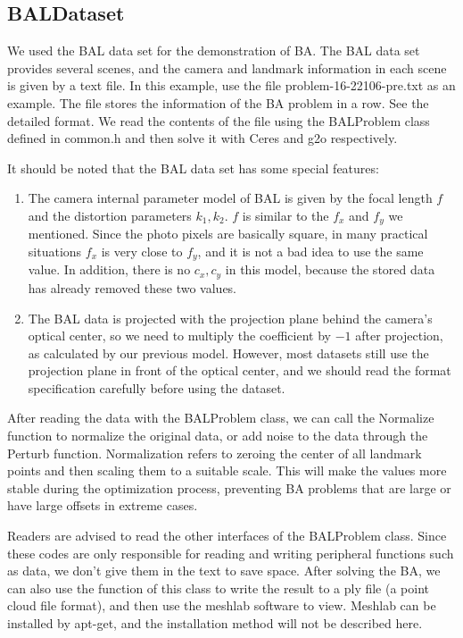 \subsection{BALDataset}
We used the BAL data set for the demonstration of BA. The BAL data set provides several scenes, and the camera and landmark information in each scene is given by a text file. In this example, use the file problem-16-22106-pre.txt as an example. The file stores the information of the BA problem in a row. See the detailed format. We read the contents of the file using the BALProblem class defined in common.h and then solve it with Ceres and g2o respectively.

It should be noted that the BAL data set has some special features:
\begin{enumerate}
    \item The camera internal parameter model of  BAL is given by the focal length $f$ and the distortion parameters $k_1, k_2$. $f$ is similar to the $f_x$ and $f_y$ we mentioned. Since the photo pixels are basically square, in many practical situations $f_x$ is very close to $f_y$, and it is not a bad idea to use the same value. In addition, there is no $c_x, c_y$ in this model, because the stored data has already removed these two values.
    \item The BAL data is projected with the projection plane behind the camera's optical center, so we need to multiply the coefficient by $-1$ after projection, as calculated by our previous model. However, most datasets still use the projection plane in front of the optical center, and we should read the format specification carefully before using the dataset.
\end{enumerate}

After reading the data with the BALProblem class, we can call the Normalize function to normalize the original data, or add noise to the data through the Perturb function. Normalization refers to zeroing the center of all landmark points and then scaling them to a suitable scale. This will make the values ​​more stable during the optimization process, preventing BA problems that are large or have large offsets in extreme cases.

Readers are advised to read the other interfaces of the BALProblem class. Since these codes are only responsible for reading and writing peripheral functions such as data, we don't give them in the text to save space. After solving the BA, we can also use the function of this class to write the result to a ply file (a point cloud file format), and then use the meshlab software to view. Meshlab can be installed by apt-get, and the installation method will not be described here.

